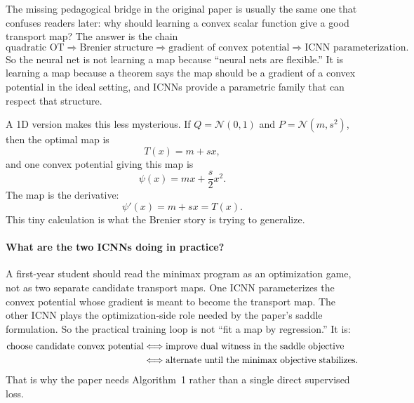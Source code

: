 \documentclass[11pt]{report}
\begin{document}
The missing pedagogical bridge in the original paper is usually the same one that
confuses readers later: why should learning a convex scalar function give a good
transport map?  The answer is the chain
\begin{equation}
\text{quadratic OT}
\Longrightarrow
\text{Brenier structure}
\Longrightarrow
\text{gradient of convex potential}
\Longrightarrow
\text{ICNN parameterization}.
\label{eq:makkuva-logic-chain}
\end{equation}
So the neural net is not learning a map because ``neural nets are flexible.''  It
is learning a map because a theorem says the map should be a gradient of a convex
potential in the ideal setting, and ICNNs provide a parametric family that can
respect that structure.

A 1D version makes this less mysterious.  If $Q=\mathcal N(0,1)$ and
$P=\mathcal N(m,s^2)$, then the optimal map is
\begin{equation}
T(x)=m+sx,
\label{eq:gaussian-affine-map}
\end{equation}
and one convex potential giving this map is
\begin{equation}
\psi(x)=mx+\frac{s}{2}x^2.
\label{eq:gaussian-convex-potential}
\end{equation}
The map is the derivative:
\begin{equation}
\psi'(x)=m+sx=T(x).
\label{eq:gaussian-convex-derivative}
\end{equation}
This tiny calculation is what the Brenier story is trying to generalize.

\paragraph{What are the two ICNNs doing in practice?}
A first-year student should read the minimax program as an optimization game, not
as two separate candidate transport maps.  One ICNN parameterizes the convex
potential whose gradient is meant to become the transport map.  The other ICNN
plays the optimization-side role needed by the paper's saddle formulation.  So the
practical training loop is not ``fit a map by regression.''  It is:
\begin{align}
\text{choose candidate convex potential}
&\Longleftrightarrow
\text{improve dual witness in the saddle objective}
\notag\\
&\Longleftrightarrow
\text{alternate until the minimax objective stabilizes}.
\label{eq:makkuva-training-logic}
\end{align}
That is why the paper needs Algorithm~1 rather than a single direct supervised
loss.
\end{document}
